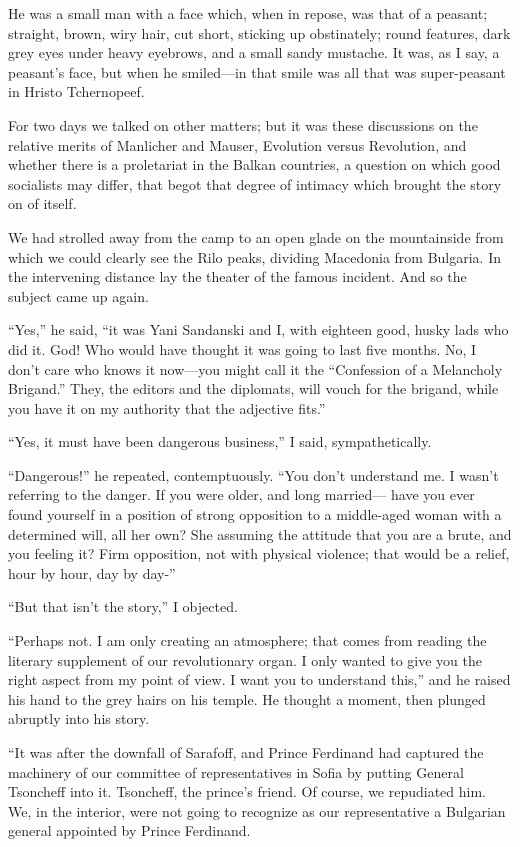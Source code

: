 \documentclass[a5paper,12pt]{book}
\begin{document}
He was a small man with a face which, when in repose, was that of a peasant; straight, brown, wiry hair, cut short, sticking up obstinately; round features, dark grey eyes under heavy eyebrows, and a small sandy mustache. It was, as I say, a peasant’s face, but when he smiled—in that smile was all that was super-peasant in Hristo Tchernopeef.

For two days we talked on other matters; but it was these discussions on the relative merits of Manlicher and Mauser, Evolution versus Revolution, and whether there is a proletariat in the Balkan countries, a question on which good socialists may differ, that begot that degree of intimacy which brought the story on of itself.

We had strolled away from the camp to an open glade on the mountainside from which we could clearly see the Rilo peaks, dividing Macedonia from Bulgaria. In the intervening distance lay the theater of the famous incident. And so the subject came up again.

“Yes,” he said, “it was Yani Sandanski and I, with eighteen good, husky lads who did it. God! Who would have thought it was going to last five months. No, I don’t care who knows it now—you might call it the “Confession of a Melancholy Brigand.” They, the editors and the diplomats, will vouch for the brigand, while you have it on my authority that the adjective fits.”

“Yes, it must have been dangerous business,” I said, sympathetically.

“Dangerous!” he repeated, contemptuously. “You don’t understand me. I wasn’t referring to the danger. If you were older, and long married— have you ever found yourself in a position of strong opposition to a middle-aged woman with a determined will, all her own? She assuming the attitude that you are a brute, and you feeling it? Firm opposition, not with physical violence; that would be a relief, hour by hour, day by day-”

“But that isn’t the story,” I objected.

“Perhaps not. I am only creating an atmosphere; that comes from reading the literary supplement of our revolutionary organ. I only wanted to give you the right aspect from my point of view. I want you to understand this,” and he raised his hand to the grey hairs on his temple. He thought a moment, then plunged abruptly into his story.

“It was after the downfall of Sarafoff, and Prince Ferdinand had captured the machinery of our committee of representatives in Sofia by putting General Tsoncheff into it. Tsoncheff, the prince's friend. Of course, we repudiated him. We, in the interior, were not going to recognize as our representative a Bulgarian general appointed by Prince Ferdinand.
\end{document}
